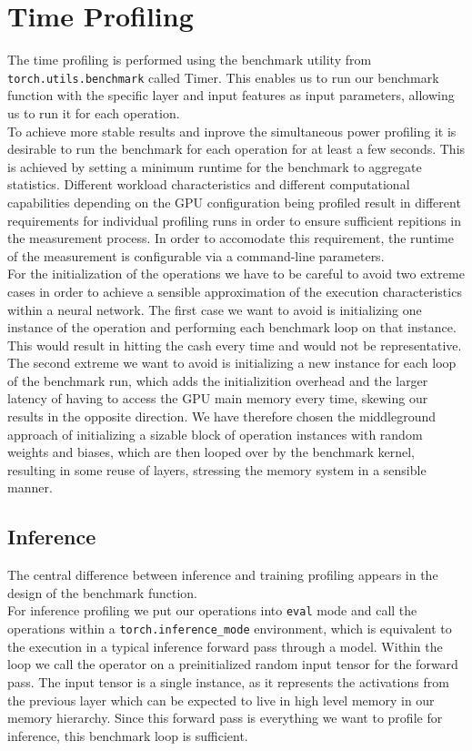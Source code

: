 \section{Time Profiling}



The time profiling is performed using the benchmark utility from \texttt{torch.utils.benchmark} called Timer. This enables us to run our benchmark function with the specific layer and input features as input parameters, allowing us to run it for each operation. \\
To achieve more stable results and inprove the simultaneous power profiling it is desirable to run the benchmark for each operation for at least a few seconds. This is achieved by setting a minimum runtime for the benchmark to aggregate statistics. Different workload characteristics and different computational capabilities depending on the GPU configuration being profiled result in different requirements for individual profiling runs in order to ensure sufficient repitions in the measurement process. In order to accomodate this requirement, the runtime of the measurement is configurable via a command-line parameters. \\
For the initialization of the operations we have to be careful to avoid two extreme cases in order to achieve a sensible approximation of the execution characteristics within a neural network. The first case we want to avoid is initializing one instance of the operation and performing each benchmark loop on that instance. This would result in hitting the cash every time and would not be representative. The second extreme we want to avoid is initializing a new instance for each loop of the benchmark run, which adds the initializition overhead and the larger latency of having to access the GPU main memory every time, skewing our results in the opposite direction. We have therefore chosen the middleground approach of initializing a sizable block of operation instances with random weights and biases, which are then looped over by the benchmark kernel, resulting in some reuse of layers, stressing the memory system in a sensible manner. \\


\subsection{Inference}
The central difference between inference and training profiling appears in the design of the benchmark function. \\
For inference profiling we put our operations into \texttt{eval} mode and call the operations within a \texttt{torch.inference\_mode} environment, which is equivalent to the execution in a typical inference forward pass through a model. Within the loop we call the operator on a preinitialized random input tensor for the forward pass. The input tensor is a single instance, as it represents the activations from the previous layer which can be expected to live in high level memory in our memory hierarchy. Since this forward pass is everything we want to profile for inference, this benchmark loop is sufficient.

